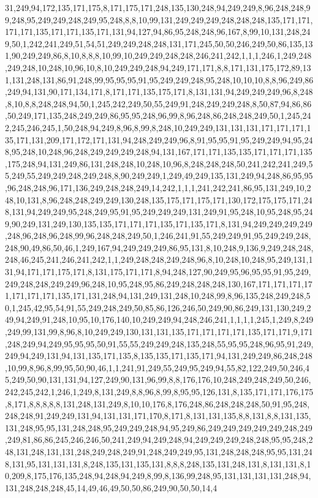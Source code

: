 31,249,94,172,135,171,175,8,171,175,171,248,135,130,248,94,249,249,8,96,248,248,99,248,95,249,249,248,249,95,248,8,8,10,99,131,249,249,249,248,248,248,135,171,171,171,171,135,171,171,135,171,131,94,127,94,86,95,248,248,96,167,8,99,10,131,248,249,50,1,242,241,249,51,54,51,249,249,248,248,131,171,245,50,50,246,249,50,86,135,131,90,249,249,86,8,10,8,8,8,10,99,10,249,249,248,248,246,241,242,1,1,1,246,1,249,248,249,248,10,248,10,96,10,8,10,249,249,248,94,249,171,171,8,8,171,131,175,172,89,131,131,248,131,86,91,248,99,95,95,95,91,95,249,249,248,95,248,10,10,10,8,8,96,249,86,249,94,131,90,171,134,171,8,171,171,135,175,171,8,131,131,94,249,249,249,96,8,248,8,10,8,8,248,248,94,50,1,245,242,249,50,55,249,91,248,249,249,248,8,50,87,94,86,86,50,249,171,135,248,249,249,86,95,95,248,96,99,8,96,248,86,248,248,249,50,1,245,242,245,246,245,1,50,248,94,249,8,96,8,99,8,248,10,249,249,131,131,131,171,171,171,135,171,131,209,171,172,171,131,94,248,249,249,96,8,91,95,95,91,95,249,249,94,95,248,95,248,10,248,96,248,249,249,249,248,94,131,167,171,171,135,135,171,171,171,135,175,248,94,131,249,86,131,248,248,10,248,10,96,8,248,248,248,50,241,242,241,249,55,249,55,249,249,248,249,248,8,90,249,249,1,249,49,249,135,131,249,94,248,86,95,95,96,248,248,96,171,136,249,248,248,249,14,242,1,1,1,241,242,241,86,95,131,249,10,248,10,131,8,96,248,248,249,249,130,248,135,175,171,175,171,130,172,175,175,171,248,131,94,249,249,95,248,249,95,91,95,249,249,249,131,249,91,95,248,10,95,248,95,249,90,249,131,249,130,135,135,171,171,171,135,171,135,171,8,131,94,249,249,249,249,248,96,248,96,248,99,96,248,248,249,50,1,246,241,91,55,249,249,91,95,249,249,248,248,90,49,86,50,46,1,249,167,94,249,249,249,86,95,131,8,10,248,9,136,9,249,248,248,248,46,245,241,246,241,242,1,1,249,248,248,249,248,96,8,10,248,10,248,95,249,131,131,94,171,171,175,171,8,131,175,171,171,8,94,248,127,90,249,95,96,95,95,91,95,249,249,248,248,249,249,96,248,10,95,248,95,86,249,248,248,248,130,167,171,171,171,171,171,171,171,135,171,131,248,94,131,249,131,248,10,248,99,8,96,135,248,249,248,50,1,245,42,95,54,91,55,249,248,249,50,85,86,126,246,50,249,90,86,249,131,130,249,249,94,249,91,248,10,95,10,176,140,10,249,249,94,248,246,241,1,1,1,1,245,1,249,8,249,249,99,131,99,8,96,8,10,249,249,130,131,131,135,171,171,171,171,135,171,171,9,171,248,249,94,249,95,95,95,50,91,55,55,249,249,248,135,248,55,95,95,248,96,95,91,249,249,94,249,131,94,131,135,171,135,8,135,135,171,135,171,94,131,249,249,86,248,248,10,99,8,96,8,99,95,50,90,46,1,1,241,91,249,55,249,95,249,94,55,82,122,249,50,246,45,249,50,90,131,131,94,127,249,90,131,96,99,8,8,176,176,10,248,249,248,249,50,246,242,245,242,1,246,1,249,8,131,249,8,8,96,8,99,8,95,95,126,131,8,135,171,171,176,175,8,171,8,8,8,8,8,131,248,131,249,8,10,10,176,8,176,248,86,248,248,248,50,91,95,248,248,248,91,249,249,131,94,131,131,171,170,8,171,8,131,131,135,8,8,131,8,8,131,135,131,248,95,95,131,248,248,95,249,249,248,94,95,249,86,249,249,249,249,249,248,249,249,81,86,86,245,246,246,50,241,249,94,249,248,94,249,249,249,248,248,95,95,248,248,131,248,131,131,248,249,248,249,91,248,249,249,95,131,248,248,248,95,95,131,248,131,95,131,131,131,8,248,135,131,135,131,8,8,8,248,135,131,248,131,8,131,131,8,10,209,8,175,176,135,248,94,248,94,249,8,99,8,136,99,248,95,131,131,131,131,248,94,131,248,248,248,45,14,49,46,49,50,50,86,249,90,50,50,14,4